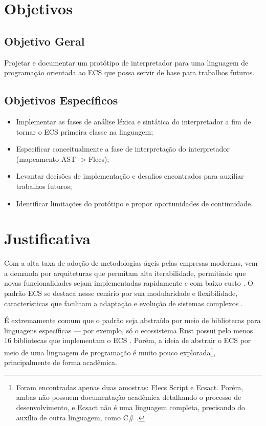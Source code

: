 \section{Objetivos} \label{sec:objetivos}

\subsection{Objetivo Geral} \label{sec:obj_geral}

Projetar e documentar um protótipo de interpretador para uma linguagem de programação orientada ao ECS que possa servir de base para trabalhos futuros.

\subsection{Objetivos Específicos}

\begin{itemize}
    \item Implementar as fases de análise léxica e sintática do interpretador a fim de tornar o ECS primeira classe na linguagem;
    \item Especificar conceitualmente a fase de interpretação do interpretador (mapeamento AST -> Flecs);
    \item Levantar decisões de implementação e desafios encontrados para auxiliar trabalhos futuros;
    \item Identificar limitações do protótipo e propor oportunidades de continuidade.
\end{itemize}

\section{Justificativa} \label{sec:justificativa}

Com a alta taxa de adoção de metodologias ágeis pelas empresas modernas, vem a demanda por arquiteturas que permitam alta iterabilidade, permitindo que novas funcionalidades sejam implementadas rapidamente e com baixo custo \cite{17thstateofagile, agile}. O padrão ECS se destaca nesse cenário por sua modularidade e flexibilidade, características que facilitam a adaptação e evolução de sistemas complexos \cite{ecsfaq}.

É extremamente comum que o padrão seja abstraído por meio de bibliotecas para linguagens específicas — por exemplo, só o ecossistema Rust possui pelo menos 16 bibliotecas que implementam o ECS \cite{arewegameyet}. Porém, a ideia de abstrair o ECS por meio de uma linguagem de programação é muito pouco explorada\footnote{Foram encontradas apenas duas amostras: Flecs Script e Ecsact. Porém, ambas não possuem documentação acadêmica detalhando o processo de desenvolvimento, e Ecsact não é uma linguagem completa, precisando do auxílio de outra linguagem, como C\# \cite{flecsscript, ecsact}.}, principalmente de forma acadêmica.

